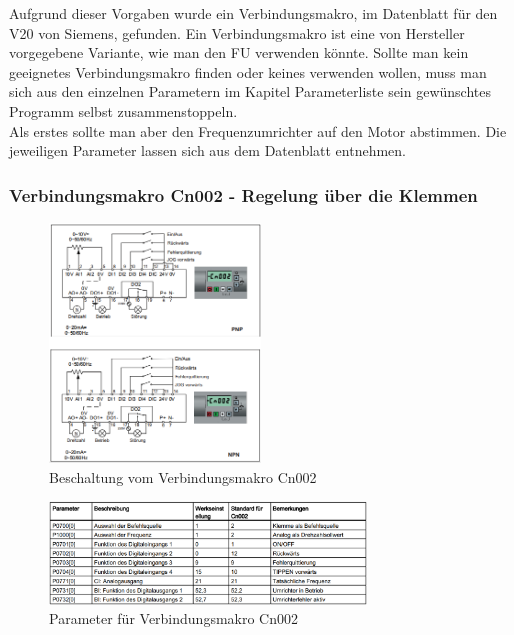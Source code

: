 Aufgrund dieser Vorgaben wurde ein Verbindungsmakro, im Datenblatt für den V20 von Siemens, gefunden. 
Ein Verbindungsmakro ist eine von Hersteller vorgegebene Variante, wie man den \ac{FU} verwenden könnte. Sollte man kein geeignetes Verbindungsmakro finden oder keines verwenden wollen, muss man sich aus den einzelnen Parametern im Kapitel Parameterliste sein gewünschtes Programm selbst zusammenstoppeln. \\
Als erstes sollte man aber den Frequenzumrichter auf den Motor abstimmen. Die jeweiligen Parameter lassen sich aus dem Datenblatt entnehmen. 

\newpage

\subsubsection{Verbindungsmakro Cn002 - Regelung über die Klemmen}

\begin{figure}[H]
\begin{center}
	\includegraphics[width=0.5\textwidth]{fig/VerbindungsmakroAufbau}
	\caption{Beschaltung vom Verbindungsmakro Cn002 \label{fig:verbindungsmakro}}
\end{center}
\end{figure}

\begin{figure}[H]
\begin{center}
	\includegraphics[width=0.75\textwidth]{fig/VerbindungsmakroParameter}
	\caption{Parameter für Verbindungsmakro Cn002 \label{fig:parameterVerbindungsmakro}}
\end{center}
\end{figure}

